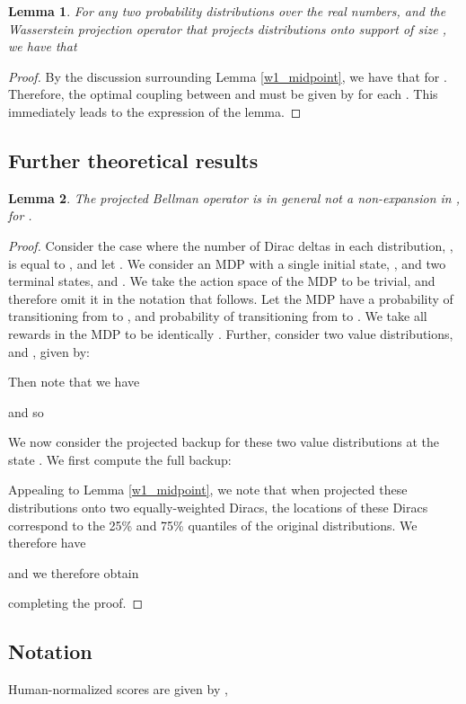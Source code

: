 \documentclass[letterpaper]{article}
\newtheorem{lem}{Lemma}
\begin{document}
\begin{lem}\label{lem:WinftyIsMaxQuantileDiff}
For any two probability distributions  over the real numbers, and the Wasserstein projection operator  that projects distributions onto support of size , we have that

\end{lem}
\begin{proof}
By the discussion surrounding Lemma \ref{w1_midpoint}, we have that  for . Therefore, the optimal coupling between  and  must be given by  for each . This immediately leads to the expression of the lemma.
\end{proof}

\subsection{Further theoretical results}

\begin{lem}\label{lem:dpnocontraction}
The projected Bellman operator  is in general not a non-expansion in , for .
\end{lem}
\begin{proof}
Consider the case where the number of Dirac deltas in each distribution, , is equal to , and let . We consider an MDP with a single initial state, , and two terminal states,  and . We take the action space of the MDP to be trivial, and therefore omit it in the notation that follows. Let the MDP have a  probability of transitioning from  to , and  probability of transitioning from  to . We take all rewards in the MDP to be identically . Further, consider two value distributions,  and , given by:

Then note that we have

and so

We now consider the projected backup for these two value distributions at the state . We first compute the full backup:

Appealing to Lemma \ref{w1_midpoint}, we note that when projected these distributions onto two equally-weighted Diracs, the locations of these Diracs correspond to the 25\% and 75\% quantiles of the original distributions. We therefore have

and we therefore obtain

completing the proof.
\end{proof}

\subsection{Notation}
Human-normalized scores are given by \cite{vanhasselt16deep},
\end{document}
